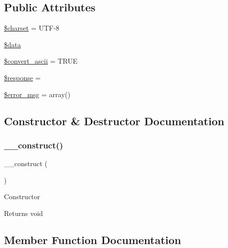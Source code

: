 \subsection*{Public Attributes}
\begin{DoxyCompactItemize}
\item 
\mbox{\hyperlink{class_c_i___trackback_af10158dd74b75f1d337e83102d6b82ce}{\$charset}} = \textquotesingle{}U\+TF-\/8\textquotesingle{}
\item 
\mbox{\hyperlink{class_c_i___trackback_a6efc15b5a2314dd4b5aaa556a375c6d6}{\$data}}
\item 
\mbox{\hyperlink{class_c_i___trackback_a488490c694dfefb9578fb22e0208e008}{\$convert\+\_\+ascii}} = T\+R\+UE
\item 
\mbox{\hyperlink{class_c_i___trackback_af4b6fb1bbc77ccc05f10da3b16935b99}{\$response}} = \textquotesingle{}\textquotesingle{}
\item 
\mbox{\hyperlink{class_c_i___trackback_acf910733622c1fa671b9f755c69c2ec7}{\$error\+\_\+msg}} = array()
\end{DoxyCompactItemize}


\subsection{Constructor \& Destructor Documentation}
\mbox{\label{class_c_i___trackback_a095c5d389db211932136b53f25f39685}} 
\subsubsection{\texorpdfstring{\+\_\+\+\_\+construct()}{\_\_construct()}}
{\footnotesize\ttfamily \+\_\+\+\_\+construct (\begin{DoxyParamCaption}{ }\end{DoxyParamCaption})}

Constructor

\begin{DoxyReturn}{Returns}
void 
\end{DoxyReturn}


\subsection{Member Function Documentation}
\mbox{\label{class_c_i___trackback_a0029bda7d34a222a5bda4ac894c31ac1}} 

